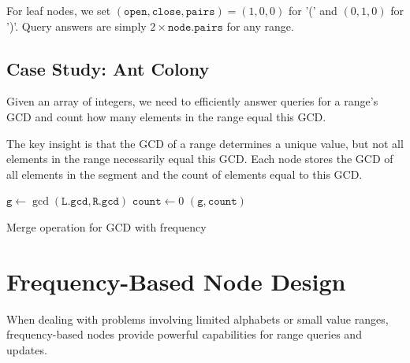
For leaf nodes, we set $(\texttt{open}, \texttt{close}, \texttt{pairs}) = (1, 0, 0)$ for '(' and $(0, 1, 0)$ for ')'. Query answers are simply $2 \times \texttt{node.pairs}$ for any range.

\subsection{Case Study: Ant Colony}



Given an array of integers, we need to efficiently answer queries for a range's GCD and count how many elements in the range equal this GCD.

The key insight is that the GCD of a range determines a unique value, but not all elements in the range necessarily equal this GCD. Each node stores the GCD of all elements in the segment and the count of elements equal to this GCD.

\begin{algorithm}[H]
\SetAlgoLined
{}
\BlankLine
$\texttt{g} \gets \gcd(\texttt{L.gcd}, \texttt{R.gcd})$\;
$\texttt{count} \gets 0$\;
\Return $(\texttt{g}, \texttt{count})$\;
\caption{Merge operation for GCD with frequency}
\end{algorithm}

\section{Frequency-Based Node Design}

When dealing with problems involving limited alphabets or small value ranges, frequency-based nodes provide powerful capabilities for range queries and updates.

